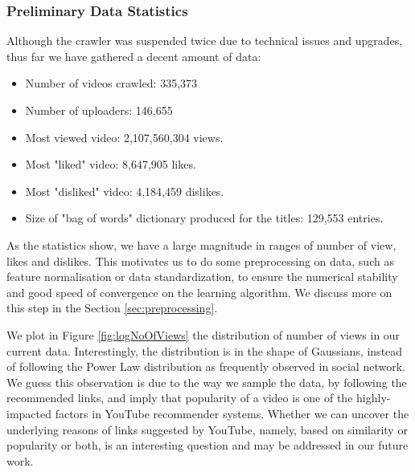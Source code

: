 \documentclass{article} %
\begin{document}
		\subsubsection{Preliminary Data Statistics}

		Although the crawler was suspended twice due to technical issues and upgrades, thus far we have gathered a decent amount of data:

		\begin{itemize}
			\item Number of videos crawled: 335,373
			\item Number of uploaders: 146,655
			\item Most viewed video: 2,107,560,304 views.
			\item Most "liked" video: 8,647,905 likes.
			\item Most "disliked" video: 4,184,459 dislikes.
			\item Size of "bag of words" dictionary produced for the titles: 129,553 entries.
		\end{itemize}

		As the statistics show, we have a large magnitude in ranges of number of view, likes and dislikes. This motivates us to do some preprocessing on data, such as feature normalisation or data standardization, to ensure the numerical stability and good speed of convergence on the learning algorithm. We discuss more on this step in the Section \ref{sec:preprocessing}.
		
		We plot in Figure \ref{fig:logNoOfViews} the distribution of number of views in our current data. Interestingly, the distribution is in the shape of Gaussians, instead of following the Power Law distribution as frequently observed in social network. We guess this observation is due to the way we sample the data, by following the recommended links, and imply that popularity of a video is one of the highly-impacted factors in YouTube recommender systems. Whether we can uncover the underlying reasons of links suggested by YouTube, namely, based on similarity or popularity or both, is an interesting question and may be addressed in our future work.
		
\end{document}
